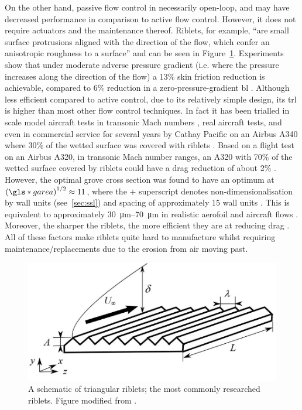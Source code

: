 On the other hand, passive flow control in necessarily open-loop, and may have decreased performance in comparison to active flow control. However, it does not require actuators and the maintenance thereof. Riblets, for example, ``are small surface protrusions aligned with the direction of the flow, which confer an anisotropic roughness to a surface'' \cite{garcia-mayoral2011} and can be seen in Figure~\ref{fig:riblets}. Experiments show that under moderate adverse pressure gradient (i.e. where the pressure increases along the direction of the flow) a 13\% skin friction reduction is achievable, compared to 6\% reduction in a zero-pressure-gradient \gls{bl} \cite{debisschop1996}. Although less efficient compared to active control, due to its relatively simple design, its \gls{trl} is higher than most other flow control techniques. In fact it has been trialled in scale model aircraft tests in transonic Mach numbers \cite{coustols1990}, real aircraft tests, and even in commercial service for several years by Cathay Pacific on an Airbus A340 where 30\% of the wetted surface was covered with riblets \cite{bechert2006}. Based on a flight test on an Airbus A320, in transonic Mach number ranges, an A320 with 70\% of the wetted surface covered by riblets could have a drag reduction of about 2\% \cite{szodruch1991}. However, the optimal grove cross section was found to have an optimum at $\left(\gls*{garea}\right)^{1 /2}\approx11$, where the $+$ superscript denotes non-dimensionalisation by wall units (see~\ref{sec:ssl}) and spacing of approximately 15 wall units \cite{garcia-mayoral2011}. This is equivalent to approximately \SIrange{30}{70}{\micro\metre} in realistic aerofoil and aircraft flows \cite{garcia-mayoral2011}. Moreover, the sharper the riblets, the more efficient they are at reducing drag \cite{garcia-mayoral2011}. All of these factors make riblets quite hard to manufacture whilst requiring maintenance/replacements due to the erosion from air moving past.

\begin{figure}[htbp]
\centering
\includegraphics[width=0.5\linewidth]{introduction/fig/riblets.jpeg}
\caption[Schematic of triangular riblets]{A schematic of triangular riblets; the most commonly researched riblets. Figure modified from \cite{raayai-ardakani2019}.}
\label{fig:riblets}
\end{figure}

